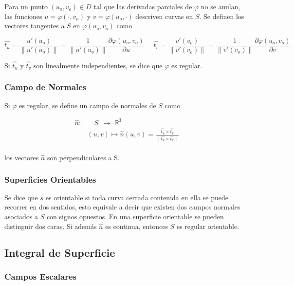Para un punto $(u_o, v_o)\in D$ tal que las derivadas parciales de $\varphi$ no se anulan, las funciones $u=\varphi(\cdot, v_o)$ y $v=\varphi(u_o, \cdot)$ descriven curvas en $S$. Se definen los vectores tangentes a $S$ en $\varphi(u_o, v_o)$ como

\[\hat{t_u} = \frac{u'(u_o)}{\|u'(u_o)\|} = \frac{1}{\|u'(u_o)\|}
\frac{\partial\varphi(u_o, v_o)}{\partial u}
\,\,\,\,\,\,\,\,
\hat{t_v} = \frac{v'(v_o)}{\|v'(v_o)\|} = \frac{1}{\|v'(v_o)\|}
\frac{\partial\varphi(u_o, v_o)}{\partial v}\]

Si $\hat{t_u}$ y $\hat{t_v}$ son linealmente independientes, se dice que $\varphi$ es regular.

\subsubsection{Campo de Normales}

Si $\varphi$ es regular, se define un campo de normales de $S$ como

\begin{equation}
\begin{split}
    \hat{n}: &\,\,\,\,\,\,S\,\,\,
    \longrightarrow \,\, \mathbb{R}^3\\
    &(u, v) \longmapsto \hat{n}(u,v)
    =\frac{\hat{t_u}\times\hat{t_v}}{\|\hat{t_u}
    \times\hat{t_v}\|}\\
\end{split}
\nonumber
\end{equation}

los vectores $\hat{n}$ son perpendiculares a S.

\subsubsection{Superficies Orientables}

Se dice que $s$ es orientable si toda curva cerrada contenida en ella se puede recorrer en dos sentidos, esto equivale a decir que existen dos campos normales asociados a $S$ con signos opuestos. En una superficie orientable se pueden distinguir dos caras. Si además $\hat{n}$ es continua, entonces $S$ es regular orientable.

\subsection{Integral de Superficie}

\subsubsection{Campos Escalares}

